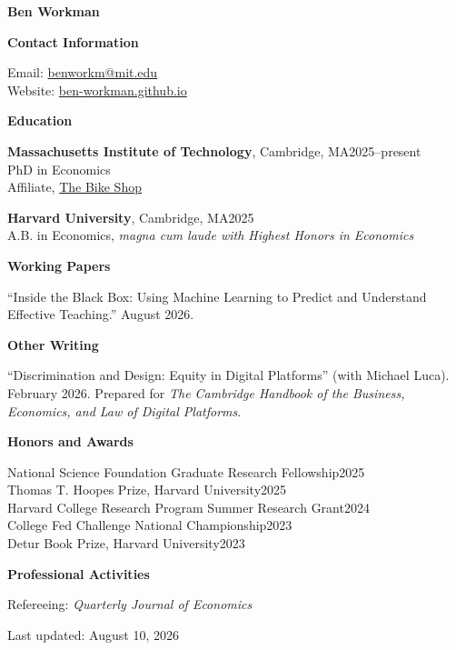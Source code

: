 \documentclass[11pt,letterpaper]{article}
\newlength{\cvlabelwidth}
\newenvironment{cvsection}[1]
  {
    \par\vspace{1.55em}
    \noindent
    \begin{minipage}[t]{\cvlabelwidth}
      \raggedright\normalsize\textbf{#1}
    \end{minipage}%
    \hspace{0.22in}%
    \begin{minipage}[t]{\dimexpr\textwidth-\cvlabelwidth-0.40in\relax}
  }
  {
    \end{minipage}
    \par
  }
\newcommand{\entryspace}{\vspace{0.85em}}
\newcommand{\datedentry}[2]{#1\hfill #2}
\begin{document}
{\LARGE\textbf{Ben Workman}}

\begin{cvsection}{Contact Information}
  Email: \href{mailto:benworkm@mit.edu}{benworkm@mit.edu}\\
  Website: \href{https://ben-workman.github.io}{ben-workman.github.io}
\end{cvsection}

\begin{cvsection}{Education}
  \datedentry{\textbf{Massachusetts Institute of Technology}, Cambridge, MA}{2025--present}\\
  PhD in Economics\\
  Affiliate, \href{https://thebikeshop.io/}{The Bike Shop}

  \entryspace
  \datedentry{\textbf{Harvard University}, Cambridge, MA}{2025}\\
  A.B. in Economics, \textit{magna cum laude with Highest Honors in Economics}
\end{cvsection}

\begin{cvsection}{Working Papers}
  ``Inside the Black Box: Using Machine Learning to Predict and Understand
  Effective Teaching.'' August 2026.
\end{cvsection}

\begin{cvsection}{Other Writing}
  ``Discrimination and Design: Equity in Digital Platforms'' (with Michael
  Luca). February 2026. Prepared for \textit{The Cambridge Handbook of the Business,
  Economics, and Law of Digital Platforms}.
\end{cvsection}

\begin{cvsection}{Honors and Awards}
  \datedentry{National Science Foundation Graduate Research Fellowship}{2025}\\
  \datedentry{Thomas T. Hoopes Prize, Harvard University}{2025}\\
  \datedentry{Harvard College Research Program Summer Research Grant}{2024}\\
  \datedentry{College Fed Challenge National Championship}{2023}\\
  \datedentry{Detur Book Prize, Harvard University}{2023}\\
\end{cvsection}

\begin{cvsection}{Professional Activities}
  Refereeing: \textit{Quarterly Journal of Economics}
\end{cvsection}

\vfill
\begin{center}
  \footnotesize\color{gray}Last updated: August 10, 2026
\end{center}
\end{document}
